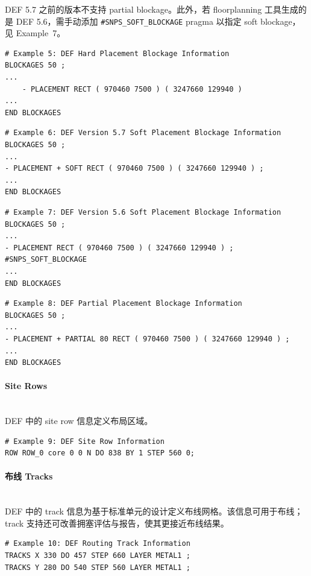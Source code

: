 \begin{noteBox}
DEF 5.7 之前的版本不支持 partial blockage。此外，若 floorplanning 工具生成的是 DEF 5.6，需手动添加 \texttt{\#SNPS\_SOFT\_BLOCKAGE} pragma 以指定 soft blockage，见 Example~7。
\end{noteBox}

\begin{lstlisting}
# Example 5: DEF Hard Placement Blockage Information
BLOCKAGES 50 ;
...
    - PLACEMENT RECT ( 970460 7500 ) ( 3247660 129940 )
...
END BLOCKAGES
\end{lstlisting}

\begin{lstlisting}
# Example 6: DEF Version 5.7 Soft Placement Blockage Information
BLOCKAGES 50 ;
...
- PLACEMENT + SOFT RECT ( 970460 7500 ) ( 3247660 129940 ) ;
...
END BLOCKAGES
\end{lstlisting}

\begin{lstlisting}
# Example 7: DEF Version 5.6 Soft Placement Blockage Information
BLOCKAGES 50 ;
...
- PLACEMENT RECT ( 970460 7500 ) ( 3247660 129940 ) ; #SNPS_SOFT_BLOCKAGE
...
END BLOCKAGES
\end{lstlisting}

\begin{lstlisting}
# Example 8: DEF Partial Placement Blockage Information
BLOCKAGES 50 ;
...
- PLACEMENT + PARTIAL 80 RECT ( 970460 7500 ) ( 3247660 129940 ) ;
...
END BLOCKAGES
\end{lstlisting}

\paragraph{Site Rows}\mbox{}\\
DEF 中的 site row 信息定义布局区域。

\begin{lstlisting}
# Example 9: DEF Site Row Information
ROW ROW_0 core 0 0 N DO 838 BY 1 STEP 560 0;
\end{lstlisting}

\paragraph{布线 Tracks}\mbox{}\\
DEF 中的 track 信息为基于标准单元的设计定义布线网格。该信息可用于布线；track 支持还可改善拥塞评估与报告，使其更接近布线结果。

\begin{lstlisting}
# Example 10: DEF Routing Track Information
TRACKS X 330 DO 457 STEP 660 LAYER METAL1 ;
TRACKS Y 280 DO 540 STEP 560 LAYER METAL1 ;
\end{lstlisting}

